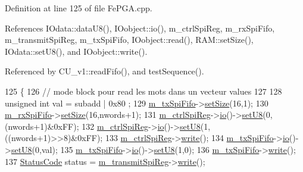 Definition at line 125 of file Fe\+P\+G\+A.\+cpp.



References I\+Odata\+::data\+U8(), I\+Oobject\+::io(), m\+\_\+ctrl\+Spi\+Reg, m\+\_\+rx\+Spi\+Fifo, m\+\_\+transmit\+Spi\+Reg, m\+\_\+tx\+Spi\+Fifo, I\+Oobject\+::read(), R\+A\+M\+::set\+Size(), I\+Odata\+::set\+U8(), and I\+Oobject\+::write().



Referenced by C\+U\+\_\+v1\+::read\+Fifo(), and test\+Sequence().


\begin{DoxyCode}
125                                                                                          \{ 
126   \textcolor{comment}{// mode block pour read les mots dans un vecteur values}
127 
128   \textcolor{keywordtype}{unsigned} \textcolor{keywordtype}{int} val = subadd | 0x80 ; 
129   \hyperlink{classFePGA_a5b3e4deb73a882e6f044450d8a733558}{m\_txSpiFifo}->\hyperlink{classRAM_adcf2ebb12f1a3e833ce7d5a33670c29d}{setSize}(16,1);
130   \hyperlink{classFePGA_a3ee7f973bfad39b48bbc1a185e9ffaec}{m\_rxSpiFifo}->\hyperlink{classRAM_adcf2ebb12f1a3e833ce7d5a33670c29d}{setSize}(16,nwords+1);
131   \hyperlink{classFePGA_a8fb76733a688dff6d91892a49a97a21f}{m\_ctrlSpiReg}->\hyperlink{classIOobject_af04fb94137c3d86849f478ac5afab5d1}{io}()->\hyperlink{classIOdata_a6c4fb2f2af01889ada889c2b7aceb24d}{setU8}(0,(nwords+1)&0xFF);
132   \hyperlink{classFePGA_a8fb76733a688dff6d91892a49a97a21f}{m\_ctrlSpiReg}->\hyperlink{classIOobject_af04fb94137c3d86849f478ac5afab5d1}{io}()->\hyperlink{classIOdata_a6c4fb2f2af01889ada889c2b7aceb24d}{setU8}(1,((nwords+1)>>8)&0xFF);
133   \hyperlink{classFePGA_a8fb76733a688dff6d91892a49a97a21f}{m\_ctrlSpiReg}->\hyperlink{classIOobject_a9f6984bc9f0fadcf800f1be2523ac744}{write}();
134   \hyperlink{classFePGA_a5b3e4deb73a882e6f044450d8a733558}{m\_txSpiFifo}->\hyperlink{classIOobject_af04fb94137c3d86849f478ac5afab5d1}{io}()->\hyperlink{classIOdata_a6c4fb2f2af01889ada889c2b7aceb24d}{setU8}(0,val);
135   \hyperlink{classFePGA_a5b3e4deb73a882e6f044450d8a733558}{m\_txSpiFifo}->\hyperlink{classIOobject_af04fb94137c3d86849f478ac5afab5d1}{io}()->\hyperlink{classIOdata_a6c4fb2f2af01889ada889c2b7aceb24d}{setU8}(1,0);
136   \hyperlink{classFePGA_a5b3e4deb73a882e6f044450d8a733558}{m\_txSpiFifo}->\hyperlink{classIOobject_a9f6984bc9f0fadcf800f1be2523ac744}{write}();
137   \hyperlink{classStatusCode}{StatusCode} status = \hyperlink{classFePGA_a003ee241fb5f32fb3442174db3fe6f49}{m\_transmitSpiReg}->\hyperlink{classIOobject_a9f6984bc9f0fadcf800f1be2523ac744}{write}();  

\end{DoxyCode}
